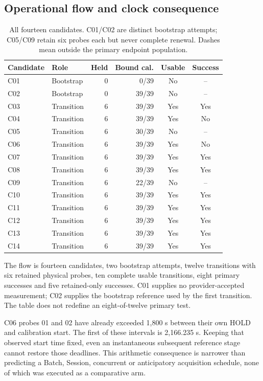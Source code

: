 \documentclass[11pt,a4paper]{article}
\begin{document}
\subsection{Operational flow and clock consequence}
\begin{table}[htbp]\centering\small
\begin{tabular}{llrrcc}\toprule
Candidate & Role & Held & Bound cal. & Usable & Success\\\midrule
C01 & Bootstrap & 0 & 0/39 & No & --\\
C02 & Bootstrap & 0 & 39/39 & No & --\\
C03 & Transition & 6 & 39/39 & Yes & Yes\\
C04 & Transition & 6 & 39/39 & Yes & No\\
C05 & Transition & 6 & 30/39 & No & --\\
C06 & Transition & 6 & 39/39 & Yes & No\\
C07 & Transition & 6 & 39/39 & Yes & Yes\\
C08 & Transition & 6 & 39/39 & Yes & Yes\\
C09 & Transition & 6 & 22/39 & No & --\\
C10 & Transition & 6 & 39/39 & Yes & Yes\\
C11 & Transition & 6 & 39/39 & Yes & Yes\\
C12 & Transition & 6 & 39/39 & Yes & Yes\\
C13 & Transition & 6 & 39/39 & Yes & Yes\\
C14 & Transition & 6 & 39/39 & Yes & Yes\\
\bottomrule
\end{tabular}
{}
\caption{All fourteen candidates. C01/C02 are distinct bootstrap attempts; C05/C09 retain six probes each but never complete renewal. Dashes mean outside the primary endpoint population.}\label{tab:v5flow}
\end{table}
The flow is fourteen candidates, two bootstrap attempts, twelve transitions with six retained physical probes, ten complete usable transitions, eight primary successes and five retained-only successes. C01 supplies no provider-accepted measurement; C02 supplies the bootstrap reference used by the first transition. The table does not redefine an eight-of-twelve primary test.

C06 probes 01 and 02 have already exceeded 1,800 s between their own HOLD and calibration start. The first of these intervals is 2,166.235 s. Keeping that observed start time fixed, even an instantaneous subsequent reference stage cannot restore those deadlines. This arithmetic consequence is narrower than predicting a Batch, Session, concurrent or anticipatory acquisition schedule, none of which was executed as a comparative arm.
\end{document}
